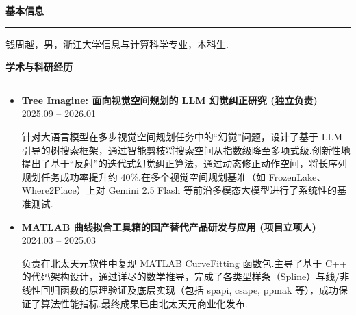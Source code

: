 
\cleardoublepage
{}

\vspace{2em}
\noindent\textbf{基本信息} \\
\rule{\textwidth}{0.5pt}
\par 钱周越，男，浙江大学信息与计算科学专业，本科生.

\vspace{2em}
\noindent\textbf{学术与科研经历} \\
\rule{\textwidth}{0.5pt}
\begin{itemize}
    \item \textbf{Tree Imagine: 面向视觉空间规划的 LLM 幻觉纠正研究 (独立负责)} \hfill 2025.09 -- 2026.01
    \par 针对大语言模型在多步视觉空间规划任务中的“幻觉”问题，设计了基于 LLM 引导的树搜索框架，通过智能剪枝将搜索空间从指数级降至多项式级.创新性地提出了基于“反射”的迭代式幻觉纠正算法，通过动态修正动作空间，将长序列规划任务成功率提升约 40\%.在多个视觉空间规划基准（如 FrozenLake、Where2Place）上对 Gemini 2.5 Flash 等前沿多模态大模型进行了系统性的基准测试.
    
    \item \textbf{MATLAB 曲线拟合工具箱的国产替代产品研发与应用 (项目立项人)} \hfill 2024.03 -- 2025.03
    \par 负责在北太天元软件中复现 MATLAB CurveFitting 函数包.主导了基于 C++ 的代码架构设计，通过详尽的数学推导，完成了各类型样条（Spline）与线/非线性回归函数的原理验证及底层实现（包括 spapi, csape, ppmak 等），成功保证了算法性能指标.最终成果已由北太天元商业化发布.
\end{itemize}

